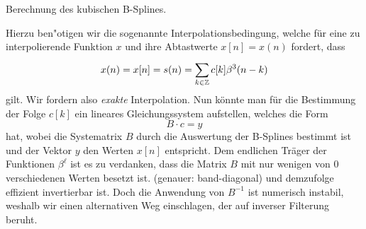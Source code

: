 \begin{listing}
\inputminted{python}{code/bsplines_eval.py}
\caption{Berechnung des kubischen B-Splines.}\label{bsplines_eval}            
\end{listing}

Hierzu ben"otigen wir die sogenannte Interpolationsbedingung, welche f\"ur eine zu interpolierende Funktion $x$ und ihre Abtastwerte $x[n] = x(n)$ fordert, dass
\begin{equation}\label{bsplines_interpol}
    x(n) = x[n] = s(n) = {\sum\limits_{k \in \mathbb{Z}}^{}{
        c[k] \beta^{3}(n - k)
    }}
\end{equation}
gilt. Wir fordern also \emph{exakte} Interpolation. Nun k\"onnte man f\"ur die Bestimmung der Folge $c[k]$ ein lineares Gleichungssystem aufstellen, welches die Form
%
\begin{equation}\label{bsplines_lse}
    B \cdot c = y
\end{equation}
%
hat, wobei die Systematrix $B$ durch die Auswertung der B-Splines bestimmt ist und der Vektor $y$ den Werten $x[n]$ entspricht. Dem endlichen Tr\"ager der Funktionen $\beta^\ell$ ist es zu verdanken, dass die Matrix $B$ mit nur wenigen von $0$ verschiedenen Werten besetzt ist. (genauer: band-diagonal) und demzufolge effizient invertierbar ist. Doch die Anwendung von $B^{-1}$ ist numerisch instabil, weshalb wir einen alternativen Weg einschlagen, der auf inverser Filterung beruht.

